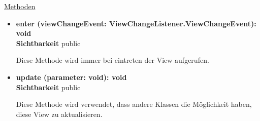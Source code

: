 \underline{Methoden}
\begin{itemize}
\itemsep0pt
\item \textbf{enter (viewChangeEvent: ViewChangeListener.ViewChangeEvent): void}\hfill\\
\textbf{Sichtbarkeit} public

Diese Methode wird immer bei eintreten der View aufgerufen.

\item \textbf{update (parameter: void): void}\hfill\\
\textbf{Sichtbarkeit} public

Diese Methode wird verwendet, dass andere Klassen die Möglichkeit haben, diese View zu aktualisieren.

\end{itemize}